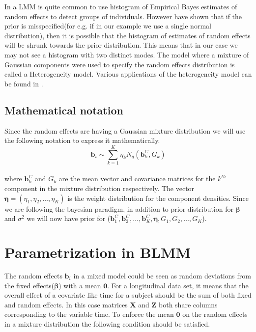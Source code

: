 In a LMM is quite common to use histogram of Empirical Bayes estimates of random effects to detect groups of individuals. However \citet{verbeke_linear_1996} have shown that if the prior is misspecified(for e.g. if in our example we use a single normal distribution), then it is possible that the histogram of estimates of random effects will be shrunk towards the prior distribution. This means that in our case we may not see a histogram with two distinct modes. The model where a mixture of Gaussian components were used to specify the random effects distribution is called a Heterogeneity model. Various applications of the heterogeneity model can be found in \citet[pg. 264]{fruhwirth-schnatter_finite_2013}.\\

\subsection{Mathematical notation}
Since the random effects are having a Gaussian mixture distribution we will use the following notation to express it mathematically.\\

$$\boldsymbol{b}_i \sim \sum_{k=1}^{K} \eta_k N_q(\boldsymbol{b}_k^C, G_k)$$\\
where $\boldsymbol{b}_k^C$ and $G_k$ are the mean vector and covariance matrices for the $k^{th}$ component in the mixture distribution respectively. The vector $\boldsymbol{\eta} = (\eta_1, \eta_2, \ldots, \eta_K)$ is the weight distribution for the component densities. Since we are following the bayesian paradigm, in addition to prior distribution for $\boldsymbol{\beta}$ and $\sigma^2$ we will now have prior for ($\boldsymbol{b}_1^C, \boldsymbol{b}_2^C, \ldots, \boldsymbol{b}_K^C, \boldsymbol{\eta}, G_1, G_2, \ldots, G_K$).

\section{Parametrization in BLMM}
The random effects $\boldsymbol{b}_i$ in a mixed model could be seen as random deviations from the fixed effects($\boldsymbol{\beta}$) with a mean $\boldsymbol{0}$. For a longitudinal data set, it means that the overall effect of a covariate like time for a subject should be the sum of both fixed and random effects. In this case matrices $\boldsymbol{X}$ and $\boldsymbol{Z}$ both share columns corresponding to the variable time. To enforce the mean $\boldsymbol{0}$ on the random effects in a mixture distribution the following condition should be satisfied.\\

